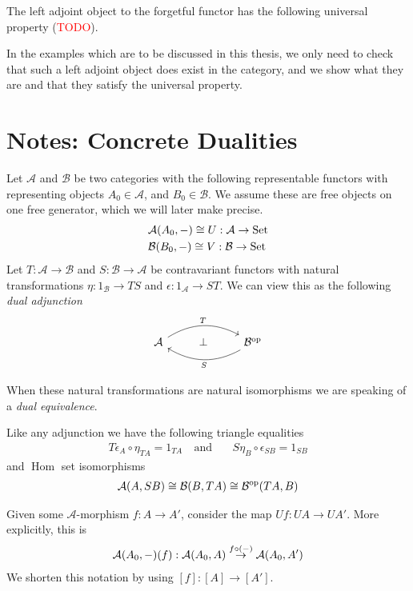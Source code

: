 \documentclass[12pt,a4paper]{article}
\DeclareMathOperator{\Hom}{Hom}
\DeclareMathOperator{\Set}{Set}
\DeclareMathOperator{\op}{op}
\def\HomA{\ensuremath\mathcal{A}}
\def\HomB{\ensuremath\mathcal{B}}
\begin{document}
The left adjoint object to the forgetful functor has the following universal property (\textcolor{red}{TODO}).

In the  examples which are to be discussed in this thesis, we only need to check that such a left adjoint object does exist in the category, and we show what they are and that they satisfy the universal property.
\section{Notes: Concrete Dualities}	

Let $\mathcal{A}$ and $\mathcal{B}$ be two categories with the following representable functors with representing objects $A_0 \in \mathcal{A}$, and $B_0 \in \mathcal{B}$. We assume these are free objects on one free generator, which we will later make precise. 
\begin{align*}
	&\HomA(A_0, -) \cong U: \mathcal{A} \to \Set\\
	&\HomB(B_0, -) \cong V: \mathcal{B} \to \Set\\
\end{align*}
Let $T: \mathcal{A} \to \mathcal{B}$ and $S: \mathcal{B} \to \mathcal{A}$ be contravariant functors with natural transformations $\eta: 1_\mathcal{B} \to TS$ and $\epsilon :  1_\mathcal{A} \to ST$. We can view this as the following \emph{dual adjunction}
\[\begin{tikzcd}
	{\mathcal{A}} & \bot & {\mathcal{B}^{\op}}
	\arrow["T", bend left, from=1-1, to=1-3]
	\arrow["S", bend left, from=1-3, to=1-1]
\end{tikzcd}\]

When these natural transformations are natural isomorphisms we are speaking of a \emph{dual equivalence}. 

Like any adjunction we have the following triangle equalities \begin{align*}
	&T{\epsilon_A} \circ \eta_{TA} = 1_{TA} \ &\text{and}& \ &  S{\eta_B} \circ \epsilon_{SB} = 1_{SB}&
\end{align*}
and $\Hom$ set isomorphisms \begin{align*}
	\HomA(A, SB) \cong \HomB(B, TA) \cong \HomB^{\op}(TA,B)
\end{align*}

Given some $\mathcal{A}$-morphism $f: A\to A'$, consider the map $Uf: UA \to UA'$. More explicitly, this is \begin{align*}
 	\HomA(A_0, -) (f) : \HomA(A_0, A) \stackrel{f \circ (-)}{\to} \HomA(A_0, A')
 \end{align*}
We shorten this notation by using $[f]: [A] \to [A']$.
\end{document}
